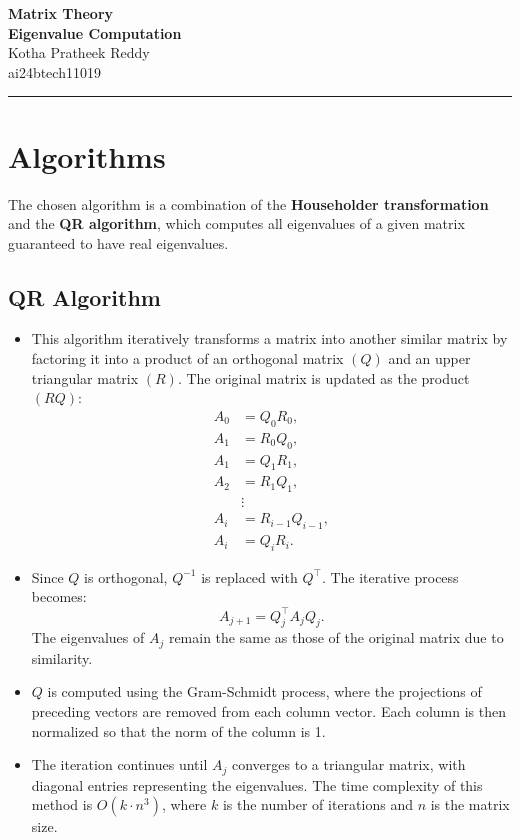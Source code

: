 \documentclass[12pt,letterpaper,onecolumn]{exam}
\begin{document}
\begingroup
    \centering
    \LARGE \textbf{Matrix Theory}\\
    \LARGE \textbf{Eigenvalue Computation}\\[0.5em]
    
    \large Kotha Pratheek Reddy\\
    \large ai24btech11019\par
\endgroup

\rule{\textwidth}{0.4pt}

\pointsdroppedatright %
\printanswers
\renewcommand{\solutiontitle}{\noindent\textbf{Answer:}\enspace} %

\section{Algorithms}
The chosen algorithm is a combination of the \textbf{Householder transformation} and the \textbf{QR algorithm}, which computes all eigenvalues of a given matrix guaranteed to have real eigenvalues.

\subsection{QR Algorithm}
\begin{itemize}
    \item This algorithm iteratively transforms a matrix into another similar matrix by factoring it into a product of an orthogonal matrix $(Q)$ and an upper triangular matrix $(R)$. The original matrix is updated as the product $(RQ)$:
    \begin{align*}
        A_0 &= Q_0R_0, \\
        A_1 &= R_0Q_0, \\
        A_1 &= Q_1R_1, \\
        A_2 &= R_1Q_1, \\
            &\vdots \\
        A_i &= R_{i-1}Q_{i-1}, \\
        A_i &= Q_iR_i.
    \end{align*}
    \item Since $Q$ is orthogonal, $Q^{-1}$ is replaced with $Q^{\top}$. The iterative process becomes:
    \[
    A_{j+1} = Q_j^{\top}A_jQ_j.
    \]
    The eigenvalues of $A_j$ remain the same as those of the original matrix due to similarity.
    \item $Q$ is computed using the Gram-Schmidt process, where the projections of preceding vectors are removed from each column vector. Each column is then normalized so that the norm of the column is 1.
    \item The iteration continues until $A_j$ converges to a triangular matrix, with diagonal entries representing the eigenvalues. The time complexity of this method is $O(k \cdot n^3)$, where $k$ is the number of iterations and $n$ is the matrix size.
\end{itemize}
\end{document}
